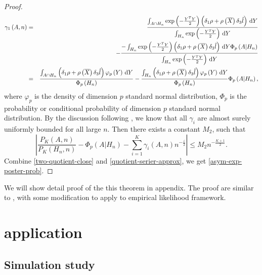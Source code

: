 \begin{thm}
\begin{proof}
\begin{eqnarray*}
\gamma_{1}\left(A,n\right) & = & \frac{\int_{A\cap H_{n}}\exp\left(-\frac{Y^{T}Y}{2}\right)\left(\delta_{1}\rho+\rho\left(\overline{X}\right)\delta_{3}\hat{l}\right)\,\mathrm{d} Y}{\int_{H_{n}}\exp\left(-\frac{Y^{T}Y}{2}\right)\,\mathrm{d} Y}\\
 &  & -\frac{-\int_{H_{n}}\exp\left(-\frac{Y^{T}Y}{2}\right)\left(\delta_{1}\rho+\rho\left(\overline{X}\right)\delta_{3}\hat{l}\right)\,\mathrm{d} Y\Phi_{p}\left(A|H_{n}\right)}{\int_{H_{n}}\exp\left(-\frac{Y^{T}Y}{2}\right)\,\mathrm{d} Y}\\
 & = & \frac{\int_{A\cap H_{n}}\left(\delta_{1}\rho+\rho\left(\overline{X}\right)\delta_{3}\hat{l}\right)\varphi_{p}\left(Y\right)\,\mathrm{d} Y}{\Phi_{p}\left(H_{n}\right)}-\frac{\int_{H_{n}}\left(\delta_{1}\rho+\rho\left(\overline{X}\right)\delta_{3}\hat{l}\right)\varphi_{p}\left(Y\right)\,\mathrm{d} Y}{\Phi_{p}\left(H_{n}\right)}\Phi_{p}\left(A|H_{n}\right),
\end{eqnarray*}
where $\varphi_{p}$ is the density of dimension $p$ standard normal
distribution, $\Phi_{p}$ is the probability or conditional probability
of dimension $p$ standard normal distribution. By the discussion
following , we know that
all $\gamma_{i}$ are almost surely uniformly bounded for all large
$n$. Then there exists a constant $M_{2}$, such that 
\begin{equation}
\left|\frac{P_{K}\left(A,n\right)}{P_{K}\left(H_{n},n\right)}-\Phi_{p}\left(A|H_{n}\right)-\sum_{i=1}^{K}\gamma_{i}\left(A,n\right)n^{-\frac{i}{2}}\right|\le M_{2}n^{-\frac{K+1}{2}}.\label{eq:quotient-serier-approx}
\end{equation}
Combine \eqref{two-quotient-close} and \eqref{quotient-serier-approx},
we get \eqref{asym-exp-poster-prob}.
\end{proof}
\end{thm}
We will show detail proof of the this theorem in appendix. The proof
are similar to \citet{johnson1970asymptotic}, with some modification
to apply to empirical likelihood framework. 
\begin{cor}

\end{cor}

\section{application\label{sec:application}}


\subsection{Simulation study}

